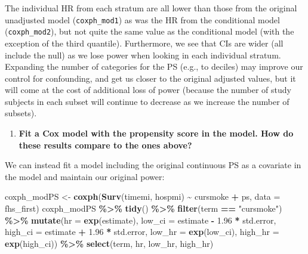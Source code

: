 \documentclass[
]{book}
\newenvironment{Shaded}{\begin{snugshade}}{\end{snugshade}}
\newcommand{\AttributeTok}[1]{\textcolor[rgb]{0.13,0.29,0.53}{#1}}
\newcommand{\FloatTok}[1]{\textcolor[rgb]{0.00,0.00,0.81}{#1}}
\newcommand{\FunctionTok}[1]{\textcolor[rgb]{0.13,0.29,0.53}{\textbf{#1}}}
\newcommand{\NormalTok}[1]{#1}
\newcommand{\OtherTok}[1]{\textcolor[rgb]{0.56,0.35,0.01}{#1}}
\newcommand{\SpecialCharTok}[1]{\textcolor[rgb]{0.81,0.36,0.00}{\textbf{#1}}}
\newcommand{\StringTok}[1]{\textcolor[rgb]{0.31,0.60,0.02}{#1}}
\providecommand{\tightlist}{%
  \setlength{\itemsep}{0pt}\setlength{\parskip}{0pt}}
\begin{document}
The individual HR from each stratum are all lower than those from the original unadjusted model (\texttt{coxph\_mod1}) as was the HR from the conditional model (\texttt{coxph\_mod2}), but not quite the same value as the conditional model (with the exception of the third quantile). Furthermore, we see that CIs are wider (all include the null) as we lose power when looking in each individual stratum. Expanding the number of categories for the PS (e.g., to deciles) may improve our control for confounding, and get us closer to the original adjusted values, but it will come at the cost of additional loss of power (because the number of study subjects in each subset will continue to decrease as we increase the number of subsets).

\begin{enumerate}
\def\labelenumi{\arabic{enumi}.}
\setcounter{enumi}{1}
\tightlist
\item
  \textbf{Fit a Cox model with the propensity score in the model. How do these results compare to the ones above?}
\end{enumerate}

We can instead fit a model including the original continuous PS as a covariate in the model and maintain our original power:

\begin{Shaded}
\begin{Highlighting}[]
\NormalTok{coxph\_modPS }\OtherTok{\textless{}{-}} \FunctionTok{coxph}\NormalTok{(}\FunctionTok{Surv}\NormalTok{(timemi, hospmi) }\SpecialCharTok{\textasciitilde{}}\NormalTok{ cursmoke }\SpecialCharTok{+}\NormalTok{ ps, }
                    \AttributeTok{data =}\NormalTok{ fhs\_first)}
\NormalTok{coxph\_modPS }\SpecialCharTok{\%\textgreater{}\%} 
  \FunctionTok{tidy}\NormalTok{() }\SpecialCharTok{\%\textgreater{}\%} 
  \FunctionTok{filter}\NormalTok{(term }\SpecialCharTok{==} \StringTok{"cursmoke"}\NormalTok{) }\SpecialCharTok{\%\textgreater{}\%} 
  \FunctionTok{mutate}\NormalTok{(}\AttributeTok{hr =} \FunctionTok{exp}\NormalTok{(estimate),}
         \AttributeTok{low\_ci =}\NormalTok{ estimate }\SpecialCharTok{{-}} \FloatTok{1.96} \SpecialCharTok{*}\NormalTok{ std.error, }
         \AttributeTok{high\_ci =}\NormalTok{ estimate }\SpecialCharTok{+} \FloatTok{1.96} \SpecialCharTok{*}\NormalTok{ std.error, }
         \AttributeTok{low\_hr =} \FunctionTok{exp}\NormalTok{(low\_ci), }
         \AttributeTok{high\_hr =} \FunctionTok{exp}\NormalTok{(high\_ci)) }\SpecialCharTok{\%\textgreater{}\%} 
  \FunctionTok{select}\NormalTok{(term, hr, low\_hr, high\_hr)}
\end{Highlighting}
\end{Shaded}
\end{document}
